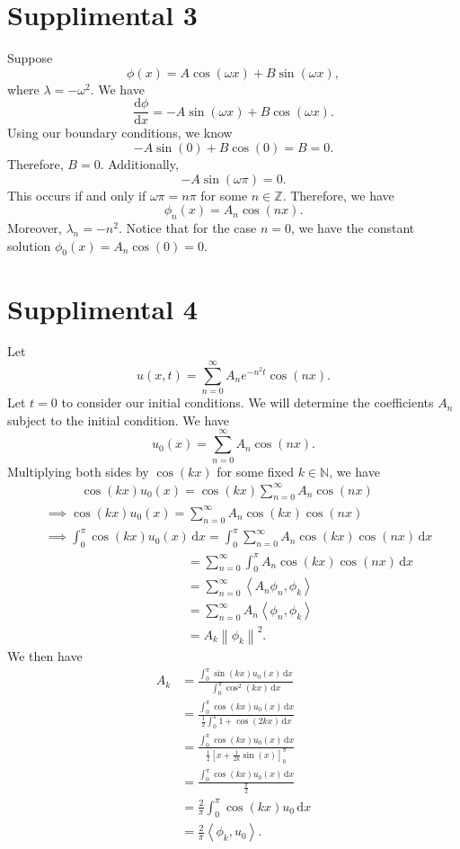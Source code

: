 \documentclass[11pt, letterpaper]{report}
\begin{document}
\section*{Supplimental 3}
Suppose
\[
	\phi (x)=A\cos (\omega x)+B\sin (\omega x)
,\]
where $\lambda =-\omega ^2$. We have
\[
	\frac{\mathrm{d}\phi }{\mathrm{d}x} =-A\sin (\omega x)+B\cos (\omega x)
.\]
Using our boundary conditions, we know
\[
	-A\sin (0)+B\cos (0)=B=0
.\]
Therefore, $B=0$. Additionally,
\[
	-A\sin (\omega \pi )=0
.\]
This occurs if and only if $\omega \pi =n\pi $ for some $n\in\mathbb{Z}$. Therefore, we have
\[
	\phi_n (x)=A_n\cos (nx)
.\]
Moreover, $\lambda_n=-n^2$. Notice that for the case $n=0$, we have the constant solution $\phi_0(x)=A_n\cos (0)=0$.
\section*{Supplimental 4}
Let
\[
	u(x,t)=\sum_{n=0}^{\infty} A_n e^{-n^2t}\cos  (nx)
.\]
Let $t=0$ to consider our initial conditions. We will determine the coefficients $A_n$ subject to the initial condition. We have
\[
	u_0(x)=\sum_{n=0}^{\infty} A_n\cos  (nx)
.\]
Multiplying both sides by $\cos  (kx)$ for some fixed $k\in\mathbb{N}$, we have
\begin{align*}
	&\qquad\;\;\; \cos  (kx)u_0\left(x \right) =\cos (kx)\sum_{n=0}^{\infty} A_n \cos  (nx)\\
	&\implies \cos  (kx)u_0(x)=\sum_{n=0}^{\infty} A_n\cos  (kx)\cos  (nx)\\
	&\implies \int_{0}^{\pi } \cos  (kx)u_0(x) \,\mathrm{d} x=\int_{0}^{\pi } \sum_{n=0}^{\infty} A_n \cos  (kx)\cos  (nx) \,\mathrm{d} x\\
	&\qquad\qquad\qquad\qquad\qquad\quad\;=\sum_{n=0}^{\infty} \int_{0}^{\pi } A_n \cos  (kx)\cos  (nx) \,\mathrm{d} x\\
	&\qquad\qquad\qquad\qquad\qquad\quad\;=\sum_{n=0}^{\infty} \left<A_n\phi_n,\phi_k \right>\\
	&\qquad\qquad\qquad\qquad\qquad\quad\;=\sum_{n=0}^{\infty} A_n\left<\phi_n,\phi_k \right> \\
	&\qquad\qquad\qquad\qquad\qquad\quad\;=A_k\left\lVert \phi_k \right\rVert^2
.\end{align*}
We then have
\begin{align*}
	A_k&=\frac{\int_{0}^{\pi } \sin (kx)u_0(x) \,\mathrm{d} x}{\int_{0}^{\pi } \cos^2(kx) \,\mathrm{d} x}\\
	   &=\frac{\int_{0}^{\pi } \cos (kx)u_0(x) \,\mathrm{d} x}{\frac{1}{2}\int_{0}^{\pi } 1+\cos (2kx) \,\mathrm{d} x}\\
	   &=\frac{\int_{0}^{\pi } \cos (kx)u_0(x) \,\mathrm{d} x}{\frac{1}{2}\left[ x+\frac{1}{2k}\sin(x) \right]_0^\pi }\\
	   &=\frac{\int_{0}^{\pi } \cos (kx)u_0(x) \,\mathrm{d} x}{\frac{\pi }{2}}\\
	   &=\frac{2}{\pi }\int_{0}^{\pi } \cos (kx)u_0 \,\mathrm{d} x\\
	   &=\frac{2}{\pi }\left<\phi_k,u_0 \right>
.\end{align*}
\end{document}
